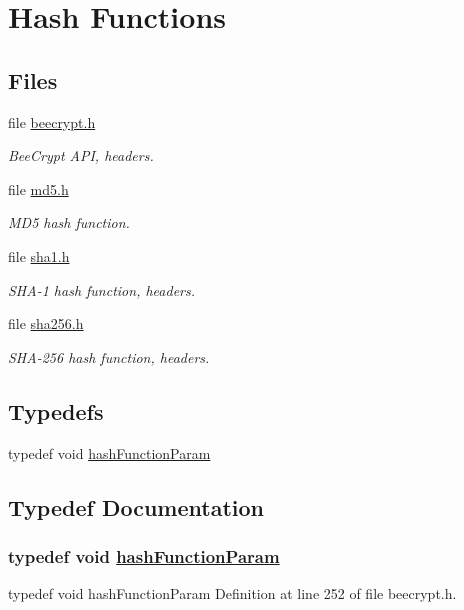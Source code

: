 \hypertarget{group__HASH__m}{
\section{Hash Functions}
\label{group__HASH__m}
}
\subsection*{Files}
\begin{CompactItemize}
\item 
file \hyperlink{beecrypt_8h}{beecrypt.h}
\begin{CompactList}\small\item\em Bee\-Crypt API, headers. \item\end{CompactList}

\item 
file \hyperlink{md5_8h}{md5.h}
\begin{CompactList}\small\item\em MD5 hash function. \item\end{CompactList}

\item 
file \hyperlink{sha1_8h}{sha1.h}
\begin{CompactList}\small\item\em SHA-1 hash function, headers. \item\end{CompactList}

\item 
file \hyperlink{sha256_8h}{sha256.h}
\begin{CompactList}\small\item\em SHA-256 hash function, headers. \item\end{CompactList}

\end{CompactItemize}
\subsection*{Typedefs}
\begin{CompactItemize}
\item 
typedef void \hyperlink{group__HASH__m_ga0}{hash\-Function\-Param}
\end{CompactItemize}


\subsection{Typedef Documentation}
\hypertarget{group__HASH__m_ga0}{
\subsubsection[hashFunctionParam]{\setlength{\rightskip}{0pt plus 5cm}typedef void \hyperlink{group__HASH__m_ga0}{hash\-Function\-Param}}}
\label{group__HASH__m_ga0}


typedef void hash\-Function\-Param Definition at line 252 of file beecrypt.h.